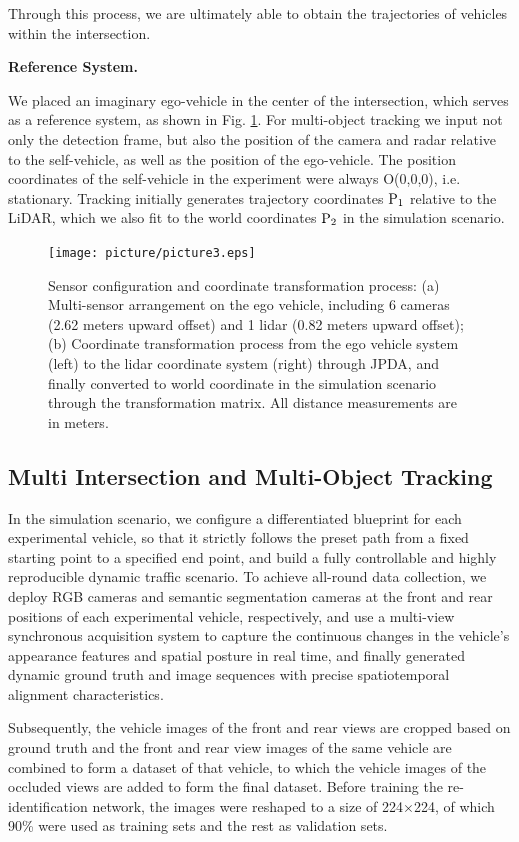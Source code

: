 \documentclass[journal,twoside,web]{ieeecolor}
\begin{document}
Through this process, we are ultimately able to obtain the trajectories of vehicles within the intersection.

\textbf{Reference System.}

We placed an imaginary ego-vehicle in the center of the intersection, which serves as a reference system, as shown in Fig. \ref{fig3}. 
For multi-object tracking we input not only the detection frame, but also the position of the camera and radar relative to the self-vehicle, as well as the position of the ego-vehicle. 
The position coordinates of the self-vehicle in the experiment were always O(0,0,0), i.e. stationary. 
Tracking initially generates trajectory coordinates \(\text P_1\) relative to the LiDAR, which we also fit to the world coordinates \(\text P_2\) in the simulation scenario.
\begin{figure}[!t]
	\centerline{\texttt{[image: picture/picture3.eps]}}
	\caption{Sensor configuration and coordinate transformation process: (a) Multi-sensor arrangement on the ego vehicle, including 6 cameras (2.62 meters upward offset) and 1 lidar (0.82 meters upward offset); (b) Coordinate transformation process from the ego vehicle system (left) to the lidar coordinate system (right) through JPDA, and finally converted to world coordinate in the simulation scenario through the transformation matrix. All distance measurements are in meters.} 
	\label{fig3} 
\end{figure}

\subsection{Multi Intersection and Multi-Object Tracking}

In the simulation scenario, we configure a differentiated blueprint for each experimental vehicle, so that it strictly follows the preset path from a fixed starting point to a specified end point, and build a fully controllable and highly reproducible dynamic traffic scenario.
To achieve all-round data collection, we deploy RGB cameras and semantic segmentation cameras at the front and rear positions of each experimental vehicle, respectively, and use a multi-view synchronous acquisition system to capture the continuous changes in the vehicle's appearance features and spatial posture in real time, and finally generated dynamic ground truth and image sequences with precise spatiotemporal alignment characteristics.

Subsequently, the vehicle images of the front and rear views are cropped based on ground truth and the front and rear view images of the same vehicle are combined to form a dataset of that vehicle, to which the vehicle images of the occluded views are added to form the final dataset.
Before training the re-identification network, the images were reshaped to a size of 224\(\times\)224, of which 90\% were used as training sets and the rest as validation sets.
\end{document}
